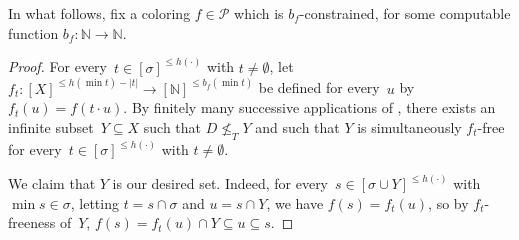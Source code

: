 \documentclass{article}
\def\P{\mathcal{P}}
\newcommand{\NN}[0]{\mathbb{N}}
\numberwithin{theorem}{section}
\newtheorem{lemma}[theorem]{Lemma}
\begin{document}
In what follows, fix a coloring $f \in \P$ which is $b_f$-constrained, for some computable function $b_f : \NN \to \NN$.


\begin{proof}
For every~$t \in [\sigma]^{\leq h(\cdot)}$ with $t \neq \emptyset$, let $f_t : [X]^{\leq h(\min t) - |t|} \to [\NN]^{\leq b_f(\min t)}$ be defined for every~$u$ by $f_t(u) = f(t \cdot u)$.
By finitely many successive applications of ,
there exists an infinite subset~$Y \subseteq X$ such that $D \not \leq_T Y$
and such that $Y$ is simultaneously $f_t$-free for every~$t \in [\sigma]^{\leq h(\cdot)}$ with $t \neq \emptyset$.

We claim that $Y$ is our desired set. Indeed, for every~$s \in [\sigma \cup Y]^{\leq h(\cdot)}$ with $\min s \in \sigma$, letting $t = s \cap \sigma$ and $u = s \cap Y$, we have $f(s) = f_t(u)$, so by $f_t$-freeness of~$Y$, $f(s) = f_t(u) \cap Y \subseteq u \subseteq s$.
\end{proof}
\end{document}
